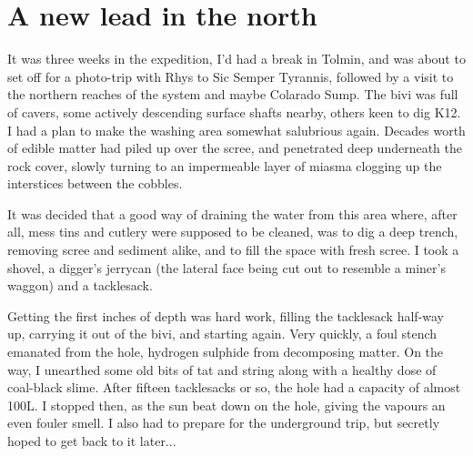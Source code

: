 \section{A new lead in the north}
\begin{marginfigure}
\end{marginfigure}
It was three weeks in the expedition, I'd had a break in Tolmin, and was about to set off for a photo-trip with Rhys to Sic Semper Tyrannis, followed by a visit to the northern reaches of the system and maybe Colarado Sump. The bivi was full of cavers, some actively descending surface shafts nearby, others keen to dig K12. I had a plan to make the washing area somewhat salubrious again. Decades worth of edible matter had piled up over the scree, and penetrated deep underneath the rock cover, slowly turning to an impermeable layer of miasma clogging up the interstices between the cobbles.

It was decided that a good way of draining the water from this area where, after all, mess tins and cutlery were supposed to be cleaned, was to dig a deep trench, removing scree and sediment alike, and to fill the space with fresh scree. I took a shovel, a digger's jerrycan (the lateral face being cut out to resemble a miner's waggon) and a tacklesack. 

Getting the first inches of depth was hard work, filling the tacklesack half-way up, carrying it out of the bivi, and starting again. Very quickly, a foul stench emanated from the hole, hydrogen sulphide from decomposing matter. On the way, I unearthed some old bits of tat and string along with a healthy dose of coal-black slime. After fifteen tacklesacks or so, the hole had a capacity of almost 100L. I stopped then, as the sun beat down on the hole, giving the vapours an even fouler smell. I also had to prepare for the underground trip, but secretly hoped to get back to it later...

